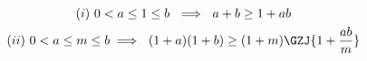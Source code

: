 \begin{gather*}
(i)\ 0<a\le1\le b \ \implies \ a+b\ge 1+ab\\ 
(ii)\ 0<a\le m\le b \implies \ (1+a)(1+b) \ge (1+m)\GZJ{1+\frac{ab}{m}}\\
\end{gather*}
